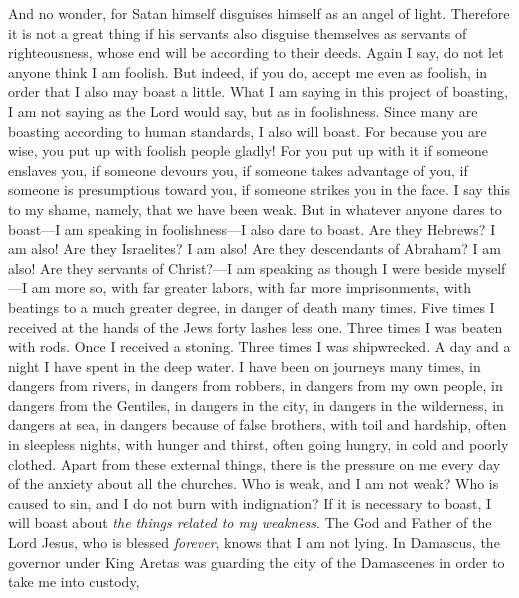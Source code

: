 \begin{biblechapter}
\verse And no wonder, for Satan himself disguises himself as an angel of light.
\verse Therefore it is not a great thing if his servants also disguise themselves as servants of righteousness, whose end will be according to their deeds.
 Again I say, do not let anyone think I am foolish. But indeed, if you do, accept me even as foolish, in order that I also may boast a little.
\verse What I am saying in this project of boasting, I am not saying as the Lord would say, but as in foolishness.
\verse Since many are boasting according to human standards, I also will boast.
\verse For because you are wise, you put up with foolish people gladly!
\verse For you put up with it if someone enslaves you, if someone devours you, if someone takes advantage of you, if someone is presumptious toward you, if someone strikes you in the face.
\verse I say this to my shame, namely, that we have been weak.
\verse But in whatever anyone dares to boast—I am speaking in foolishness—I also dare to boast.
\verse Are they Hebrews? I am also! Are they Israelites? I am also! Are they descendants of Abraham? I am also!
\verse Are they servants of Christ?—I am speaking as though I were beside myself—I am more so, with far greater labors, with far more imprisonments, with beatings to a much greater degree, in danger of death many times.
\verse Five times I received at the hands of the Jews forty lashes less one.
\verse Three times I was beaten with rods. Once I received a stoning. Three times I was shipwrecked. A day and a night I have spent in the deep water.
\verse I have been on journeys many times, in dangers from rivers, in dangers from robbers, in dangers from my own people, in dangers from the Gentiles, in dangers in the city, in dangers in the wilderness, in dangers at sea, in dangers because of false brothers,
\verse with toil and hardship, often in sleepless nights, with hunger and thirst, often going hungry, in cold and poorly clothed.
\verse Apart from these external things, there is the pressure on me every day of the anxiety about all the churches.
\verse Who is weak, and I am not weak? Who is caused to sin, and I do not burn with indignation?
\verse If it is necessary to boast, I will boast about \textit{the things related to my weakness}.
\verse The God and Father of the Lord Jesus, who is blessed \textit{forever}, knows that I am not lying.
\verse In Damascus, the governor under King Aretas was guarding the city of the Damascenes in order to take me into custody,
\end{biblechapter}

